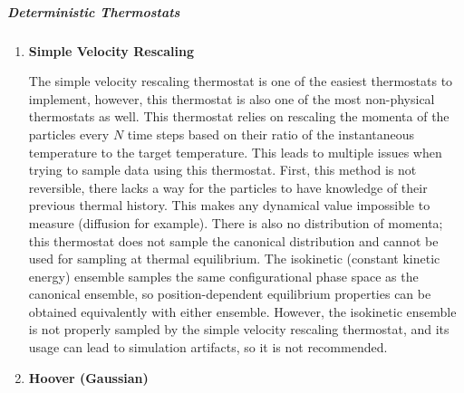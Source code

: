 \documentclass[9pt,bestpractices]{livecoms}
\begin{document}
\subparagraph{Deterministic Thermostats}
\begin{enumerate}[listparindent=\parindent]
    \item \textbf{Simple Velocity Rescaling}

        The simple velocity rescaling thermostat is one of the easiest thermostats to implement, however, this thermostat is also one of the most non-physical thermostats as well.
        This thermostat relies on rescaling the momenta of the particles every $N$ time steps based on their ratio of the instantaneous temperature to the target temperature\cite{thermostatAlgorithms2005}.
        This leads to multiple issues when trying to sample data using this thermostat.
        First, this method is not reversible, there lacks a way for the particles to have knowledge of their previous thermal history.
        This makes any dynamical value impossible to measure (diffusion for example).
        There is also no distribution of momenta; this thermostat does not sample the canonical distribution and cannot be used for sampling at thermal equilibrium.
        The isokinetic (constant kinetic energy) ensemble samples the same configurational phase space as the canonical ensemble, so position-dependent equilibrium properties can be obtained equivalently with either ensemble\cite{Minary:2003:JChemPhys:Algorithms}.
        However, the isokinetic ensemble is not properly sampled by the simple velocity rescaling thermostat, and its usage can lead to simulation artifacts, so it is not recommended\cite{Braun:2018:arXiv:Anomalous}.

    \item \textbf{Hoover (Gaussian)}
        

\end{enumerate}
\end{document}
